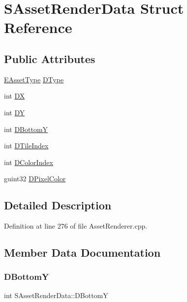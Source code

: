 \hypertarget{structSAssetRenderData}{}\section{S\+Asset\+Render\+Data Struct Reference}
\label{structSAssetRenderData}
\subsection*{Public Attributes}
\begin{DoxyCompactItemize}
\item 
\hyperlink{GameDataTypes_8h_a5600d4fc433b83300308921974477fec}{E\+Asset\+Type} \hyperlink{structSAssetRenderData_ae986cfe9d4238fa31fb511b40392d97f}{D\+Type}
\item 
int \hyperlink{structSAssetRenderData_ab432edfd1146e38a92576b78e2ad5581}{DX}
\item 
int \hyperlink{structSAssetRenderData_af27e8a46e21a0935983bfc0d34d9ceba}{DY}
\item 
int \hyperlink{structSAssetRenderData_a187b7d405b649f0f400a3a8204ef7de2}{D\+BottomY}
\item 
int \hyperlink{structSAssetRenderData_a8c97c7f34d5b359f6fa23ce215a09929}{D\+Tile\+Index}
\item 
int \hyperlink{structSAssetRenderData_a589dca7066d667b74c954b9b16671454}{D\+Color\+Index}
\item 
guint32 \hyperlink{structSAssetRenderData_a94ac857717a32afcd7118316df5f8d88}{D\+Pixel\+Color}
\end{DoxyCompactItemize}


\subsection{Detailed Description}


Definition at line 276 of file Asset\+Renderer.\+cpp.



\subsection{Member Data Documentation}
\hypertarget{structSAssetRenderData_a187b7d405b649f0f400a3a8204ef7de2}{}\label{structSAssetRenderData_a187b7d405b649f0f400a3a8204ef7de2} 
\subsubsection{\texorpdfstring{D\+BottomY}{DBottomY}}
{\footnotesize\ttfamily int S\+Asset\+Render\+Data\+::\+D\+BottomY}



